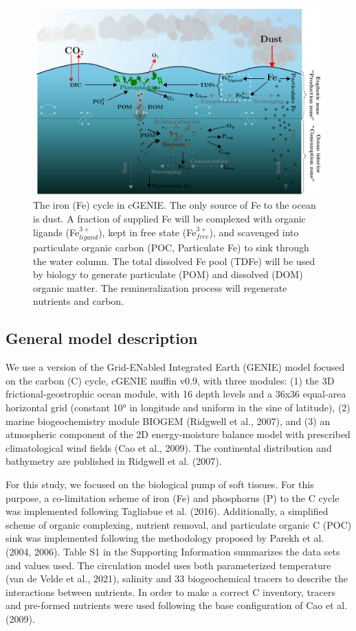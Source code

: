
\begin{figure}[h!]
    \includegraphics[scale=0.8]{../Paper_Draft/tikz/Fe.pdf}
    \caption{The iron (Fe) cycle in cGENIE. The only source of Fe to the ocean is dust. A fraction of supplied Fe will be complexed with organic ligands (Fe$^{3+}_{ligand}$), kept in free state (Fe$^{3+}_{free}$), and scavenged into particulate organic carbon (POC, Particulate Fe) to sink through the water column. The total dissolved Fe pool (TDFe) will be used by biology to generate particulate (POM) and dissolved (DOM) organic matter. The remineralization process will regenerate nutrients and carbon.}
\end{figure}

\subsection{General model description}

We use a version of the Grid-ENabled Integrated Earth (GENIE) model focused on the carbon (C) cycle, cGENIE muffin v0.9, with three modules: (1) the 3D frictional-geostrophic ocean module, with 16 depth levels and a 36x36 equal-area horizontal grid (constant 10° in longitude and uniform in the sine of latitude), (2) marine biogeochemistry module BIOGEM (Ridgwell et al., 2007), and (3) an atmospheric component of the 2D energy-moisture balance model with prescribed climatological wind fields (Cao et al., 2009). The continental distribution and bathymetry are published in Ridgwell et al. (2007).

For this study, we focused on the biological pump of soft tissues. For this purpose, a co-limitation scheme of iron (Fe) and phosphorus (P) to the C cycle was implemented following Tagliabue et al. (2016). Additionally, a simplified scheme of organic complexing, nutrient removal, and particulate organic C (POC) sink was implemented following the methodology proposed by Parekh et al. (2004, 2006). Table S1 in the Supporting Information summarizes the data sets and values used. The circulation model uses both parameterized temperature (van de Velde et al., 2021), salinity and 33 biogeochemical tracers to describe the interactions between nutrients. In order to make a correct C inventory, tracers and pre-formed nutrients were used following the base configuration of Cao et al. (2009).

